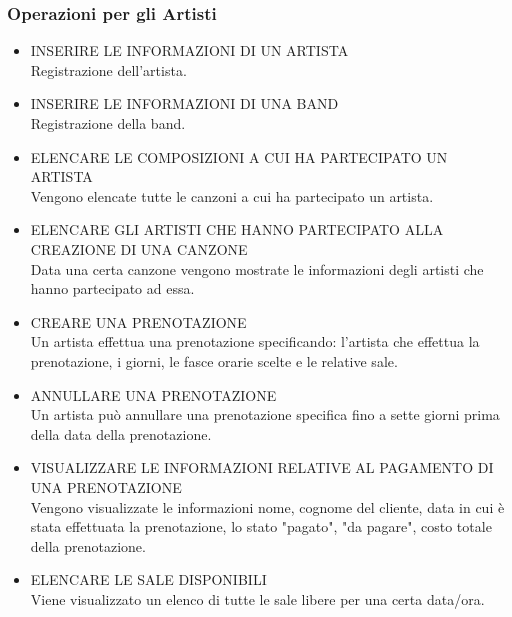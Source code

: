\documentclass{article}
\newcounter{counteroperazioni}
\newcommand{\coperazioni}{\addtocounter{counteroperazioni}{1}\thecounteroperazioni}
\begin{document}
\subsubsection{Operazioni per gli Artisti}
\setcounter{counteroperazioni}{0}
\begin{itemize}[labelindent=1.5em,labelsep=.5cm,leftmargin=*]
    \item [\textbf{A\coperazioni)}] INSERIRE LE INFORMAZIONI DI UN ARTISTA \\ Registrazione dell'artista.
    \item [\textbf{A\coperazioni)}] INSERIRE LE INFORMAZIONI DI UNA BAND \\  Registrazione della band.
    \item [\textbf{A\coperazioni)}] ELENCARE LE COMPOSIZIONI A CUI HA PARTECIPATO UN ARTISTA \\ Vengono elencate tutte le canzoni a cui ha partecipato un artista.
    \item [\textbf{A\coperazioni)}] ELENCARE GLI ARTISTI CHE HANNO PARTECIPATO ALLA CREAZIONE DI UNA CANZONE \\ Data una certa canzone vengono mostrate le informazioni degli artisti che hanno partecipato ad essa.

    \item [\textbf{A\coperazioni)}] CREARE UNA PRENOTAZIONE \\ Un artista effettua una prenotazione specificando: l'artista che effettua la prenotazione, i giorni, le fasce orarie scelte e le relative sale. 
    \item [\textbf{A\coperazioni)}] ANNULLARE UNA PRENOTAZIONE \\ Un artista può annullare una prenotazione specifica fino a sette giorni prima della data della prenotazione.
    \item [\textbf{A\coperazioni)}] VISUALIZZARE LE INFORMAZIONI RELATIVE AL PAGAMENTO DI UNA PRENOTAZIONE \\ Vengono visualizzate le informazioni nome, cognome del cliente, data in cui è stata effettuata la prenotazione, lo stato "pagato", "da pagare", costo totale della prenotazione. 
    \item [\textbf{A\coperazioni)}] ELENCARE LE SALE DISPONIBILI \\ Viene visualizzato un elenco di tutte le sale libere per una certa data/ora.
\end{itemize}
\end{document}
